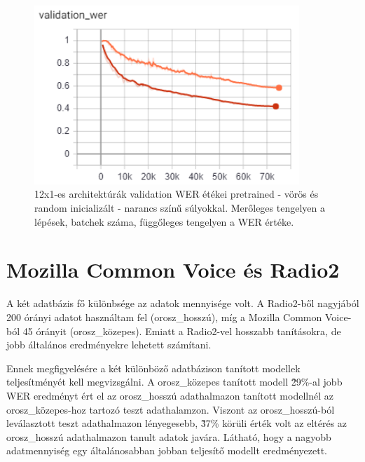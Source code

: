 \begin{figure}[!ht]
\centering
\includegraphics[width=100mm, keepaspectratio]{figures/12x1_pretrained_vs_random.png}
\caption{12x1-es architektúrák validation WER étékei pretrained - vörös és random inicializált - narancs színű súlyokkal. Merőleges tengelyen a lépések, batchek száma, függőleges tengelyen a WER értéke.}
\end{figure}

\section{Mozilla Common Voice és Radio2}

A két adatbázis fő különbsége az adatok mennyisége volt. A Radio2-ből nagyjából 200 órányi adatot használtam fel (orosz\_hosszú), míg a Mozilla Common Voice-ból 45 órányit (orosz\_közepes). Emiatt a Radio2-vel hosszabb tanításokra, de jobb általános eredményekre lehetett számítani.

Ennek megfigyelésére a két különböző adatbázison tanított modellek teljesítményét kell megvizsgálni. A orosz\_közepes tanított modell \~29\%-al jobb WER eredményt ért el az orosz\_hosszú adathalmazon tanított modellnél az orosz\_közepes-hoz tartozó teszt adathalamzon. Viszont az orosz\_hosszú-ból leválasztott teszt adathalmazon lényegesebb, \~37\% körüli érték volt az eltérés az orosz\_hosszú adathalmazon tanult adatok javára. Látható, hogy a nagyobb adatmennyiség egy általánosabban jobban teljesítő modellt eredményezett.